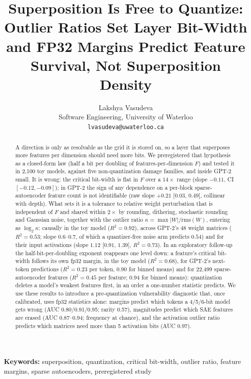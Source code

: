 \documentclass{article}
\title{Superposition Is Free to Quantize: Outlier Ratios Set Layer Bit-Width and FP32 Margins Predict Feature Survival, Not Superposition Density}
\author{Lakshya Vasudeva \\ Software Engineering, University of Waterloo \\ \texttt{lvasudeva@uwaterloo.ca}}
\begin{document}
\nolinenumbers
\maketitle
\vspace{-18pt}
\begin{abstract}
A direction is only as resolvable as the grid it is stored on, so a layer that superposes more features per dimension
should need more bits. We preregistered
that hypothesis as a closed-form law (half a bit per doubling of features-per-dimension $F$) and tested it in 2{,}100
toy models, against five non-quantization damage families, and inside GPT-2 small. It is wrong:
the critical bit-width is flat in $F$ over a $14\times$ range (slope $-0.11$, CI $[-0.12,-0.09]$); in GPT-2 the sign of any dependence on a per-block sparse-autoencoder feature count is not identifiable (raw slope
$+0.21$ [$0.03$, $0.49$], collinear with depth). What sets it is a
tolerance to relative weight perturbation that is independent of $F$ and shared within $2\times$ by rounding, dithering,
stochastic rounding and Gaussian noise, together with the outlier ratio $\kappa=\max|W|/\mathrm{rms}(W)$, entering as
$\log_2\kappa$: causally in the toy model ($R^2=0.92$), across GPT-2's 48 weight matrices ($R^2=0.53$; slope $0.6$--$0.7$, of
which a quantizer-free noise arm predicts $0.54$) and for their input activations (slope $1.12$ [$0.91$, $1.39$], $R^2=0.73$). In an exploratory follow-up the half-bit-per-doubling exponent reappears one level down: a feature's critical
bit-width follows its own fp32 margin, in the toy model ($R^2=0.68$), for GPT-2's next-token predictions ($R^2=0.23$ per token, $0.90$ for binned means) and for 22{,}499 sparse-autoencoder features ($R^2=0.45$ per feature;
$0.94$ for binned means):
quantization deletes a model's weakest features first, in an order a one-number statistic predicts. We use these results to introduce a pre-quantization vulnerability diagnostic that,
once calibrated, uses fp32 statistics alone: margins predict which tokens a 4/5/6-bit model gets wrong (AUC 0.80/0.91/0.95; rarity 0.57), magnitudes predict which
SAE features are erased (AUC 0.87--0.94; frequency at chance), and the activation outlier ratio predicts which matrices need more
than 5 activation bits (AUC 0.97).
\end{abstract}
\begin{center}\vspace{-1pt}\small\textbf{Keywords:} superposition, quantization, critical bit-width, outlier ratio, feature margins, sparse autoencoders, preregistered study\end{center}
\end{document}
